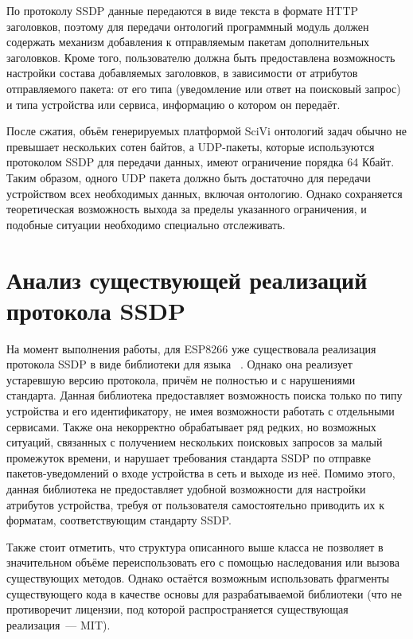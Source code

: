 По протоколу SSDP данные передаются в виде текста в формате HTTP заголовков, поэтому для передачи онтологий программный модуль должен содержать механизм добавления к отправляемым пакетам дополнительных заголовков.
Кроме того, пользователю должна быть предоставлена возможность настройки состава добавляемых заголовков, в зависимости от атрибутов отправляемого пакета: от его типа (уведомление или ответ на поисковый запрос) и типа устройства или сервиса, информацию о котором он передаёт.

После сжатия, объём генерируемых платформой SciVi онтологий задач обычно не превышает нескольких сотен байтов, а UDP-пакеты, которые используются протоколом SSDP для передачи данных, имеют ограничение порядка 64 Кбайт.
Таким образом, одного UDP пакета должно быть достаточно для передачи устройством всех необходимых данных, включая онтологию.
Однако сохраняется теоретическая возможность выхода за пределы указанного ограничения, и подобные ситуации необходимо специально отслеживать.

\section{Анализ существующей реализаций протокола SSDP}

На момент выполнения работы, для ESP8266 уже существовала реализация протокола SSDP в виде библиотеки для языка \CPP~\cite{web:esp-ssdp}.
Однако она реализует устаревшую версию протокола, причём не полностью и с нарушениями стандарта.
Данная библиотека предоставляет возможность поиска только по типу устройства и его идентификатору, не имея возможности работать с отдельными сервисами.
Также она некорректно обрабатывает ряд редких, но возможных ситуаций, связанных с получением нескольких поисковых запросов за малый промежуток времени, и нарушает требования стандарта SSDP по отправке пакетов-уведомлений о входе устройства в сеть и выходе из неё.
Помимо этого, данная библиотека не предоставляет удобной возможности для настройки атрибутов устройства, требуя от пользователя самостоятельно приводить их к форматам, соответствующим стандарту SSDP.

Также стоит отметить, что структура описанного выше класса не позволяет в значительном объёме переиспользовать его с помощью наследования или вызова существующих методов.
Однако остаётся возможным использовать фрагменты существующего кода в качестве основы для разрабатываемой библиотеки (что не противоречит лицензии, под которой распространяется существующая реализация~--- MIT).

